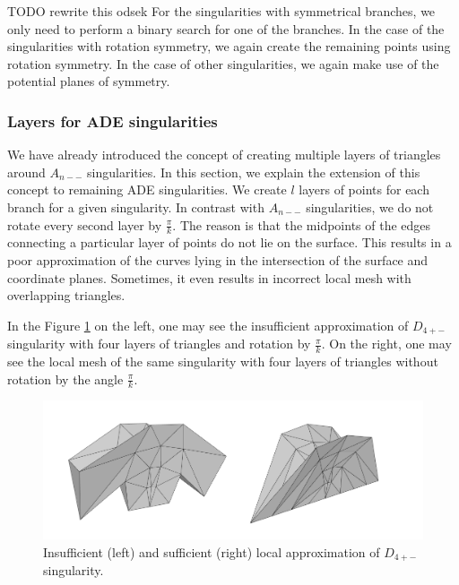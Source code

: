 TODO rewrite this odsek
For the singularities with symmetrical branches, we only need to perform a binary
search for one of the branches. In the case of the singularities with rotation
symmetry, we again create the remaining points using rotation symmetry.
In the case of other singularities, we again make use of the
potential planes of symmetry.

\subsubsection*{Layers for ADE singularities}
We have already introduced the concept of creating multiple layers of triangles around
$A_{n--}$ singularities. In this section, we explain the extension of this concept
to remaining ADE singularities. We create $l$ layers of
points for each branch for a given singularity. In contrast with $A_{n--}$ singularities, we do not 
rotate every second layer by $\frac{\pi}{k}$. The reason is that the midpoints of
the edges connecting a particular layer of points do not lie on the surface. This results
in a poor approximation of the curves lying in the intersection of the surface 
and coordinate planes. Sometimes, it even results in incorrect local mesh with 
overlapping triangles.

In the Figure \ref{img:56} on the left, one may see the insufficient approximation
of $D_{4+-}$ singularity with
four layers of triangles and rotation by $\frac{\pi}{k}$. On the right, one
may see the local mesh of the same singularity with four layers of triangles
without rotation by the angle $\frac{\pi}{k}$.

\begin{figure}
    \centerline{\includegraphics[scale=0.4]{images/img56}}
    \caption[Insufficient and sufficient local approximation]
    {Insufficient (left) and sufficient (right) local approximation of $D_{4+-}$ singularity.}
    \label{img:56}
\end{figure}

